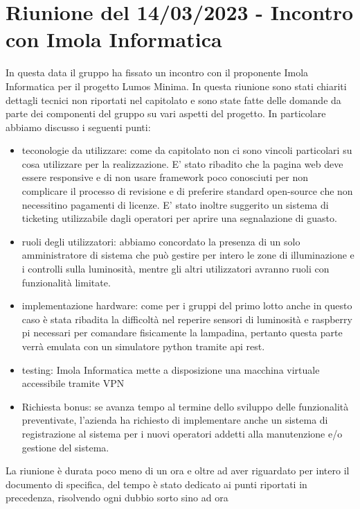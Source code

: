 \documentclass[12pt]{article}
\begin{document}
\section{Riunione del 14/03/2023 - Incontro con Imola Informatica}
In questa data il gruppo ha fissato un incontro con il proponente Imola Informatica per il progetto Lumos Minima.
In questa riunione sono stati chiariti dettagli tecnici non riportati nel capitolato e sono state fatte delle domande da parte dei componenti del gruppo su vari aspetti del progetto.
In particolare abbiamo discusso i seguenti punti:
\begin{itemize}
    \item teconologie da utilizzare: come da capitolato non ci sono vincoli particolari su cosa utilizzare per la realizzazione. E' stato ribadito che la pagina web deve essere responsive e di non usare framework poco conosciuti per non complicare il processo di revisione e di preferire standard open-source che non necessitino pagamenti di licenze. E' stato inoltre suggerito un sistema di ticketing utilizzabile dagli operatori per aprire una segnalazione di guasto.
    \item ruoli degli utilizzatori: abbiamo concordato la presenza di un solo amministratore di sistema che può gestire per intero le zone di illuminazione e i controlli sulla luminosità, mentre gli altri utilizzatori avranno ruoli con funzionalità limitate.
    \item implementazione hardware: come per i gruppi del primo lotto anche in questo caso è stata ribadita la difficoltà nel reperire sensori di luminosità e raspberry pi necessari per comandare fisicamente la lampadina, pertanto questa parte verrà emulata con un simulatore python tramite api rest.
    \item testing: Imola Informatica mette a disposizione una macchina virtuale accessibile tramite VPN
    \item Richiesta bonus: se avanza tempo al termine dello sviluppo delle funzionalità preventivate, l'azienda ha richiesto di implementare anche un sistema di registrazione al sistema per i nuovi operatori addetti alla manutenzione e/o gestione del sistema.
\end{itemize}
La riunione è durata poco meno di un ora e oltre ad aver riguardato per intero il documento di specifica, del tempo è stato dedicato ai punti riportati in precedenza, risolvendo ogni dubbio sorto sino ad ora
\end{document}
